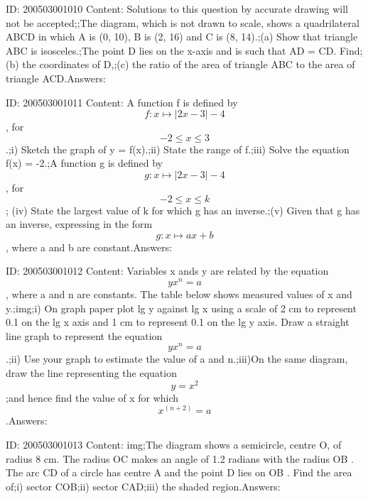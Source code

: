 \documentclass{article}
\begin{document}
ID: 200503001010
Content:
Solutions to this question by accurate drawing will not be accepted;;The diagram, which is not drawn to scale, shows a quadrilateral ABCD in which A is (0, 10), B is (2, 16) and C is (8, 14).;(a) Show that triangle ABC is isosceles.;The point D lies on the x-axis and is such that AD = CD. Find;(b) the coordinates of D,;(c) the ratio of the area of triangle ABC to the area of triangle ACD.Answers:

ID: 200503001011
Content:
A function f is defined by $$f:x \mapsto |2x-3|-4$$, for $$-2\leq x\leq3$$.;i) Sketch the graph of y = f(x).;ii)	State the range of f.;iii) Solve the equation f(x) = -2.;A function g is defined by $$g:x \mapsto |2x-3|-4$$, for $$-2\leq x\leq k$$ ; (iv) State the largest value of k for which g has an inverse.;(v) Given that g has an inverse, expressing in the form $$g:x \mapsto ax+b$$, where a and b are constant.Answers:

ID: 200503001012
Content:
Variables x ands y are related by the equation $$yx^n=a$$, where a and n are constants. The table below shows measured values of x and y.;img;i)	On graph paper plot lg y against lg x using a scale of 2 cm to represent 0.1 on the lg x axis and 1 cm to represent 0.1 on the lg y axis. Draw a straight line graph to represent the equation $$yx^n=a$$.;ii)	Use your graph to estimate the value of a and n.;iii)On the same diagram, draw the line representing the equation $$y = x^2$$;and hence find the value of x for which $$x^{(n+2)}=a$$.Answers:

ID: 200503001013
Content:
img;The diagram shows a semicircle, centre O, of radius 8 cm. The radius OC makes an angle of 1.2 radians with the radius OB . The arc CD of a circle has centre A and the point D lies on OB . Find the area of;i)	sector COB;ii)	sector CAD;iii)	the shaded region.Answers:
\end{document}
